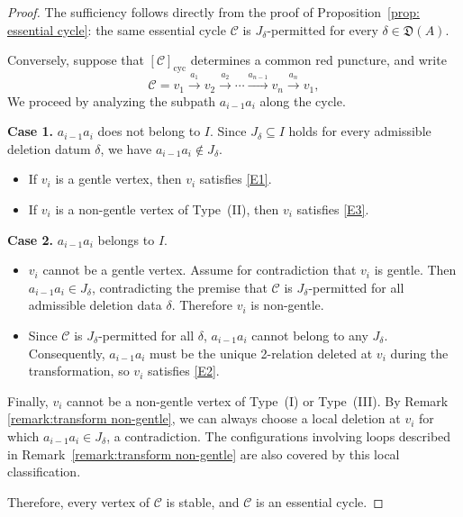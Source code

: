 \documentclass[11pt]{amsart}
\numberwithin{equation}{section}
\theoremstyle{definition}
\begin{document}
\begin{proof}
The sufficiency follows directly from the proof of
Proposition~\ref{prop: essential cycle}: the same essential cycle
\(\mathcal C\) is \(J_\delta\)-permitted for every
\(\delta\in\mathfrak D(A)\).

Conversely, suppose that
\([\mathcal C]_{\mathrm{cyc}}\) determines a common red puncture, and
write
\[
    \mathcal C=
    v_1\xrightarrow{a_1}v_2\xrightarrow{a_2}\cdots
    \xrightarrow{a_{n-1}}v_n\xrightarrow{a_n}v_1,
\]
We proceed by analyzing the subpath \(a_{i-1}a_i\) along the cycle.

\noindent\textbf{Case 1.} \(a_{i-1}a_i\) does not belong to $I$.
  Since \(J_\delta \subseteq I\) holds for every admissible deletion datum \(\delta\), we have \(a_{i-1}a_i \notin J_\delta\).
  \begin{itemize}
      \item If \(v_i\) is a gentle vertex, then \(v_i\) satisfies \ref{E1}.
      \item If \(v_i\) is a non-gentle vertex of Type~\textup{(II)}, then \(v_i\) satisfies \ref{E3}.
  \end{itemize}

\noindent\textbf{Case 2.} \(a_{i-1}a_i\) belongs to $I$. 
  \begin{itemize}
    \item  \(v_i\) cannot be a gentle vertex. Assume for contradiction that \(v_i\) is gentle. Then \(a_{i-1}a_i \in J_\delta\), contradicting the premise that \(\mathcal{C}\) is \(J_\delta\)-permitted for all admissible deletion data \(\delta\). Therefore \(v_i\) is non-gentle.
    \item Since \(\mathcal{C}\) is \(J_\delta\)-permitted for all \(\delta\),  \(a_{i-1}a_i\) cannot belong to any \(J_\delta\).
     Consequently, \(a_{i-1}a_i\) must be the unique 2-relation deleted at \(v_i\) during the transformation, so \(v_i\) satisfies \ref{E2}.
\end{itemize}


Finally, \(v_i\) cannot be a  non-gentle vertex of Type~\textup{(I)} or
Type~\textup{(III)}. By Remark \ref{remark:transform non-gentle}, we can always choose a local deletion at \(v_i\) for which
$a_{i-1}a_i\in J_\delta$, a contradiction. The configurations involving loops described in Remark~\ref{remark:transform non-gentle} are also covered by this local classification.

Therefore, every vertex of \(\mathcal C\) is stable, and \(\mathcal C\) is an essential cycle.
\end{proof}
\end{document}
